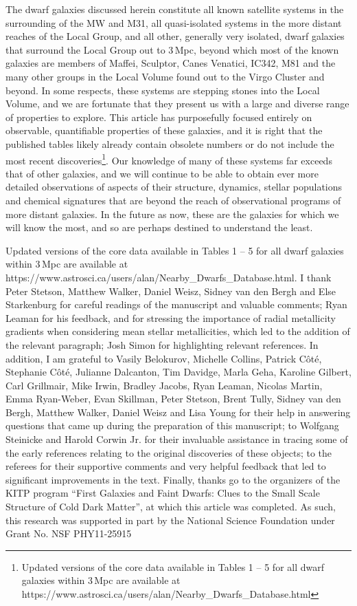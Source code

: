 \documentclass[manuscript]{aastex}
\begin{document}
The dwarf galaxies discussed herein constitute all known satellite
systems in the surrounding of the MW and M31, all quasi-isolated
systems in the more distant reaches of the Local Group, and all other,
generally very isolated, dwarf galaxies that surround the Local Group
out to 3\,Mpc, beyond which most of the known galaxies are members of
Maffei, Sculptor, Canes Venatici, IC342, M81 and the many other groups
in the Local Volume found out to the Virgo Cluster and beyond. In some
respects, these systems are stepping stones into the Local Volume, and
we are fortunate that they present us with a large and diverse range
of properties to explore. This article has purposefully focused
entirely on observable, quantifiable properties of these galaxies, and
it is right that the published tables likely already contain obsolete
numbers or do not include the most recent discoveries\footnote{Updated
  versions of the core data available in Tables 1 -- 5 for all dwarf
  galaxies within 3\,Mpc are available at
  https://www.astrosci.ca/users/alan/Nearby\_Dwarfs\_Database.html}. Our knowledge of many
of these systems far exceeds that of other galaxies, and we will
continue to be able to obtain ever more detailed observations of
aspects of their structure, dynamics, stellar populations and chemical
signatures that are beyond the reach of observational programs of more
distant galaxies. In the future as now, these are the galaxies for
which we will know the most, and so are perhaps destined to understand
the least.

\acknowledgements Updated versions of the core data available in
Tables 1 -- 5 for all dwarf galaxies within 3\,Mpc are available at
https://www.astrosci.ca/users/alan/Nearby\_Dwarfs\_Database.html. I thank Peter Stetson,
Matthew Walker, Daniel Weisz, Sidney van den Bergh and Else
Starkenburg for careful readings of the manuscript and valuable
comments; Ryan Leaman for his feedback, and for stressing the
importance of radial metallicity gradients when considering mean
stellar metallicities, which led to the addition of the relevant
paragraph; Josh Simon for highlighting relevant references. In
addition, I am grateful to Vasily Belokurov, Michelle Collins, Patrick
C{\^o}t{\'e}, Stephanie C{\^o}t{\'e}, Julianne Dalcanton, Tim Davidge,
Marla Geha, Karoline Gilbert, Carl Grillmair, Mike Irwin, Bradley
Jacobs, Ryan Leaman, Nicolas Martin, Emma Ryan-Weber, Evan Skillman,
Peter Stetson, Brent Tully, Sidney van den Bergh, Matthew Walker,
Daniel Weisz and Lisa Young for their help in answering questions that
came up during the preparation of this manuscript; to Wolfgang
Steinicke and Harold Corwin Jr. for their invaluable assistance in
tracing some of the early references relating to the original
discoveries of these objects; to the referees for their supportive
comments and very helpful feedback that led to significant
improvements in the text. Finally, thanks go to the organizers of the
KITP program ``First Galaxies and Faint Dwarfs: Clues to the Small
Scale Structure of Cold Dark Matter'', at which this article was
completed. As such, this research was supported in part by the National
Science Foundation under Grant No. NSF PHY11-25915
\end{document}
